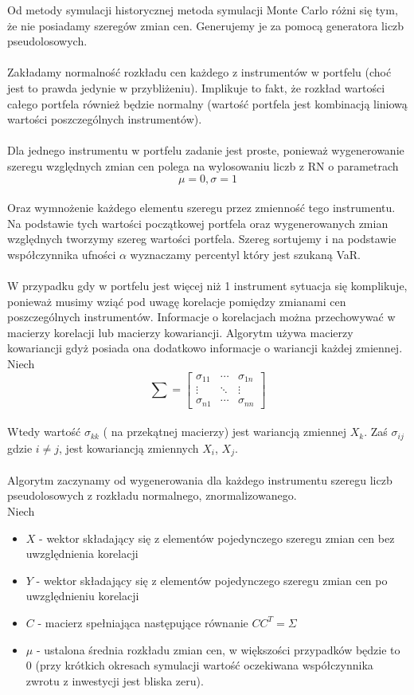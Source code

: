 \documentclass[11pt,titlepage]{article}
\begin{document}
Od metody symulacji historycznej  metoda symulacji Monte Carlo różni się tym, że nie posiadamy szeregów zmian cen. Generujemy je za pomocą generatora liczb pseudolosowych.
\\
\\
Zakładamy normalność rozkładu cen każdego z instrumentów w portfelu (choć jest to prawda jedynie w przybliżeniu).  Implikuje to fakt, że rozkład wartości całego portfela również będzie normalny (wartość portfela jest kombinacją liniową wartości poszczególnych instrumentów).
\\
\\
Dla jednego instrumentu w portfelu zadanie jest proste, ponieważ wygenerowanie szeregu względnych zmian cen polega na wylosowaniu liczb z RN o parametrach
$$\mu =0, \sigma =1 $$
\\
Oraz wymnożenie każdego elementu szeregu przez zmienność tego instrumentu. Na podstawie tych wartości początkowej portfela oraz wygenerowanych zmian względnych tworzymy szereg wartości portfela. Szereg sortujemy i na podstawie współczynnika ufności $\alpha$ wyznaczamy percentyl który jest szukaną VaR.
\\
\\
W przypadku gdy w portfelu jest więcej niż 1 instrument sytuacja się komplikuje, ponieważ musimy wziąć pod uwagę korelacje pomiędzy zmianami cen poszczególnych instrumentów.  Informacje o korelacjach można przechowywać w macierzy korelacji lub macierzy kowariancji. Algorytm używa macierzy kowariancji gdyż posiada ona dodatkowo informacje o wariancji każdej zmiennej.
\\
Niech
$$
\sum =\begin{bmatrix}
\sigma_{11} & \cdots  & \sigma_{1n}\\ 
 \vdots & \ddots  & \vdots \\ 
 \sigma_{n1}& \cdots  & \sigma_{nn}
\end{bmatrix}
$$
\\
Wtedy wartość $ \sigma_{kk} $ ( na przekątnej macierzy) jest wariancją zmiennej $ X_{k} $.
Zaś $ \sigma_{ij} $ gdzie $ i \neq j $, jest kowariancją zmiennych $ X_i $,  $ X_j $.
\\
\\
Algorytm zaczynamy od wygenerowania dla każdego instrumentu szeregu liczb pseudolosowych z rozkładu normalnego, znormalizowanego.  
\\
Niech 
\begin{itemize}
  \item $  X $ - wektor składający się z elementów pojedynczego szeregu zmian cen bez uwzględnienia korelacji
	\item $ Y $ - wektor składający się z elementów pojedynczego szeregu zmian cen po uwzględnieniu korelacji
	\item $ C  $ - macierz spełniająca następujące równanie $ C  C^{T} = \Sigma $
	\item $  \mu $ - ustalona średnia rozkładu zmian cen, w większości przypadków będzie to 0 (przy krótkich okresach symulacji wartość oczekiwana współczynnika zwrotu z inwestycji jest bliska zeru).

\end{itemize}
\end{document}
